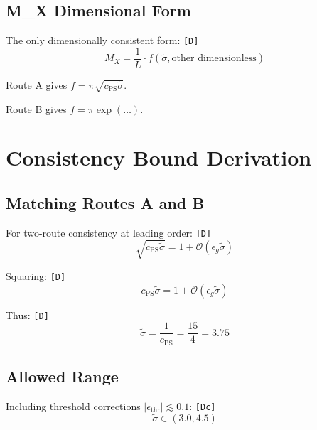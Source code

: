 \documentclass[11pt,a4paper]{article}
\newcommand{\tagD}{\textcolor{green!50!black}{\texttt{[D]}}}
\newcommand{\tagDc}{\textcolor{blue!70!black}{\texttt{[Dc]}}}
\theoremstyle{definition}
\begin{document}
\subsection{M\_X Dimensional Form}
\label{app:mx-dimensional}

The only dimensionally consistent form: \tagD{}
\begin{equation}
\label{eq:mx-dim-form}
M_X = \frac{1}{L} \cdot f(\tilde{\sigma}, \text{other dimensionless})
\end{equation}

Route A gives $f = \pi \sqrt{c_{\text{PS}} \tilde{\sigma}}$.

Route B gives $f = \pi \exp(\ldots)$.

\section{Consistency Bound Derivation}
\label{app:consistency-bound}

\subsection{Matching Routes A and B}
\label{app:matching-routes}

For two-route consistency at leading order: \tagD{}
\begin{equation}
\label{eq:consistency-leading}
\sqrt{c_{\text{PS}} \tilde{\sigma}} = 1 + \mathcal{O}(\epsilon_g \tilde{\sigma})
\end{equation}

Squaring: \tagD{}
\begin{equation}
\label{eq:consistency-squared}
c_{\text{PS}} \tilde{\sigma} = 1 + \mathcal{O}(\epsilon_g \tilde{\sigma})
\end{equation}

Thus: \tagD{}
\begin{equation}
\label{eq:sigma-consistency-value}
\tilde{\sigma} = \frac{1}{c_{\text{PS}}} = \frac{15}{4} = 3.75
\end{equation}

\subsection{Allowed Range}
\label{app:allowed-range}

Including threshold corrections $|\epsilon_{\text{thr}}| \lesssim 0.1$: \tagDc{}
\begin{equation}
\label{eq:sigma-range-final}
\tilde{\sigma} \in (3.0, 4.5)
\end{equation}
\end{document}
